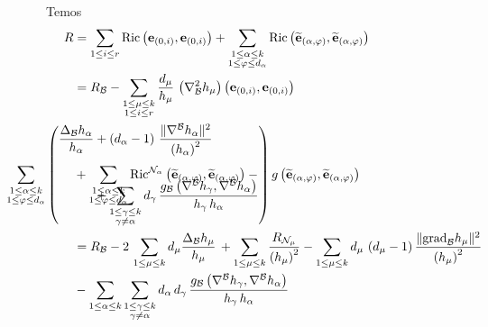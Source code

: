 \begin{demm}
Temos
\begin{align*}
R &= \sum_{1 \leq i \leq r} \Ric\parent{\be_{(0, i)}, \be_{(0, i)} } + \sum_{ \substack{1 \leq \alpha \leq k \\
1 \leq \varphi \leq d_{\alpha}}} \Ric\parent{ \bee_{(\alpha, \varphi)}, \bee_{(\alpha, \varphi)} } \\
&= R_{\bb} - \sum_{\substack{1 \leq \mu \leq k \\
1 \leq i \leq r}} \frac{d_{\mu}}{h_{\mu}} \, \parent{\nabla^2_{\bb} h_{\mu}}\parent{\be_{(0, i)}, \be_{(0, i)}} \\
&+\sum_{ \substack{1 \leq \alpha \leq k \\
1 \leq \varphi \leq d_{\alpha}}} \Ric^{\nn_{\alpha}}\parent{ \bee_{(\alpha, \varphi)}, \bee_{(\alpha, \varphi)} } - \begin{split}\hspace{-7.1cm}
    \sum_{\substack{1 \leq \alpha \leq k \\
    1 \leq \varphi \leq d_{\alpha}}}\left(
    \begin{aligned}
          \frac{\Delta_{\bb} h_{\alpha}}{h_{\alpha}} &+ \parent{d_{\alpha} - 1} \, \frac{\| \cn^{\bb} h_{\alpha} \|^2}{\parent{h_{\alpha}}^2} \\[0.5cm]
         &+ \sum_{\substack{1 \leq \gamma \leq k \\
\gamma \neq \alpha}} d_{\gamma} \, \frac{g_{\bb} \parent{ \cn^{\bb} h_{\gamma}, \cn^{\bb} h_{\alpha} }}{h_{\gamma} \, h_{\alpha}}
    \end{aligned}
    \right) g\parent{ \bee_{(\alpha, \varphi)}, \bee_{(\alpha, \varphi)} } 
\end{split} \\
&= R_{\bb} - 2 \, \sum_{1 \leq \mu \leq k} d_{\mu} \frac{\Delta_{\bb} h_{\mu}}{h_{\mu}} \, + \sum_{1 \leq \mu \leq k} \frac{R_{\nn_{\mu}}}{\parent{h_{\mu}}^2} - \sum_{1 \leq \mu \leq k} d_{\mu} \, \parent{ d_{\mu} - 1} \frac{\|\grad_{\bb} h_{\mu} \|^2}{\parent{h_{\mu}}^2} \\
&- \sum_{1 \leq \alpha \leq k} \sum_{\substack{1 \leq \gamma \leq k \\
\gamma \neq \alpha}} d_{\alpha} \, d_{\gamma} \,  \frac{g_{\bb} \parent{ \cn^{\bb} h_{\gamma}, \cn^{\bb} h_{\alpha} }}{h_{\gamma} \, h_{\alpha}}
\end{align*}
\end{demm}


